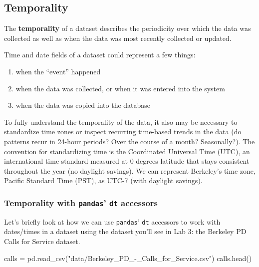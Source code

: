 \documentclass[
  letterpaper,
  DIV=11,
  numbers=noendperiod]{scrreprt}
\newenvironment{Shaded}{\begin{snugshade}}{\end{snugshade}}
\newcommand{\NormalTok}[1]{\textcolor[rgb]{0.00,0.23,0.31}{#1}}
\newcommand{\OperatorTok}[1]{\textcolor[rgb]{0.37,0.37,0.37}{#1}}
\newcommand{\StringTok}[1]{\textcolor[rgb]{0.13,0.47,0.30}{#1}}
\providecommand{\tightlist}{%
  \setlength{\itemsep}{0pt}\setlength{\parskip}{0pt}}\usepackage{longtable,booktabs,array}
\begin{document}
\subsection{Temporality}\label{temporality}

The \textbf{temporality} of a dataset describes the periodicity over
which the data was collected as well as when the data was most recently
collected or updated.

Time and date fields of a dataset could represent a few things:

\begin{enumerate}
\def\labelenumi{\arabic{enumi}.}
\tightlist
\item
  when the ``event'' happened
\item
  when the data was collected, or when it was entered into the system
\item
  when the data was copied into the database
\end{enumerate}

To fully understand the temporality of the data, it also may be
necessary to standardize time zones or inspect recurring time-based
trends in the data (do patterns recur in 24-hour periods? Over the
course of a month? Seasonally?). The convention for standardizing time
is the Coordinated Universal Time (UTC), an international time standard
measured at 0 degrees latitude that stays consistent throughout the year
(no daylight savings). We can represent Berkeley's time zone, Pacific
Standard Time (PST), as UTC-7 (with daylight savings).

\subsubsection{\texorpdfstring{Temporality with \texttt{pandas}'
\texttt{dt}
accessors}{Temporality with pandas' dt accessors}}\label{temporality-with-pandas-dt-accessors}

Let's briefly look at how we can use \texttt{pandas}' \texttt{dt}
accessors to work with dates/times in a dataset using the dataset you'll
see in Lab 3: the Berkeley PD Calls for Service dataset.

\begin{Shaded}
\begin{Highlighting}[]
\NormalTok{calls }\OperatorTok{=}\NormalTok{ pd.read\_csv(}\StringTok{"data/Berkeley\_PD\_{-}\_Calls\_for\_Service.csv"}\NormalTok{)}
\NormalTok{calls.head()}
\end{Highlighting}
\end{Shaded}
\end{document}
